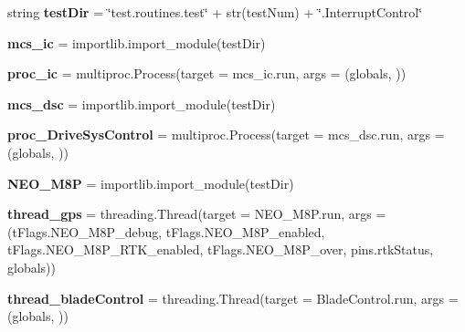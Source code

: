 \begin{DoxyCompactItemize}
\item 
\mbox{\label{namespacemcs_1_1MowBotControl_af9ebf22026b4e70fe6f3a6ed6937418e}} 
string {\bfseries test\+Dir} = \char`\"{}test.\+routines.\+test\char`\"{} + str(test\+Num) + \char`\"{}.Interrupt\+Control\char`\"{}
\item 
\mbox{\label{namespacemcs_1_1MowBotControl_a9b88ac38da151805a4e679b17eda5d92}} 
{\bfseries mcs\+\_\+ic} = importlib.\+import\+\_\+module(test\+Dir)
\item 
\mbox{\label{namespacemcs_1_1MowBotControl_a8ed47be2572882fe9305e18583dfaf9d}} 
{\bfseries proc\+\_\+ic} = multiproc.\+Process(target = mcs\+\_\+ic.\+run, args = (globals, ))
\item 
\mbox{\label{namespacemcs_1_1MowBotControl_a99bcc42dec4b409a9745e66fca187403}} 
{\bfseries mcs\+\_\+dsc} = importlib.\+import\+\_\+module(test\+Dir)
\item 
\mbox{\label{namespacemcs_1_1MowBotControl_a920759e9d70e236e6048db3dfeb3bd55}} 
{\bfseries proc\+\_\+\+Drive\+Sys\+Control} = multiproc.\+Process(target = mcs\+\_\+dsc.\+run, args = (globals, ))
\item 
\mbox{\label{namespacemcs_1_1MowBotControl_a518974b6b418ec57238901bd77861118}} 
{\bfseries N\+E\+O\+\_\+\+M8P} = importlib.\+import\+\_\+module(test\+Dir)
\item 
\mbox{\label{namespacemcs_1_1MowBotControl_a0009ea2dc9747c2edfb01b6fbf2c2068}} 
{\bfseries thread\+\_\+gps} = threading.\+Thread(target = N\+E\+O\+\_\+\+M8\+P.\+run, args = (t\+Flags.\+N\+E\+O\+\_\+\+M8\+P\+\_\+debug, t\+Flags.\+N\+E\+O\+\_\+\+M8\+P\+\_\+enabled, t\+Flags.\+N\+E\+O\+\_\+\+M8\+P\+\_\+\+R\+T\+K\+\_\+enabled, t\+Flags.\+N\+E\+O\+\_\+\+M8\+P\+\_\+over, pins.\+rtk\+Status, globals))
\item 
\mbox{\label{namespacemcs_1_1MowBotControl_ab04479cf3b6f7539868dd1d03bbc0d9b}} 
{\bfseries thread\+\_\+blade\+Control} = threading.\+Thread(target = Blade\+Control.\+run, args = (globals, ))
\end{DoxyCompactItemize}


